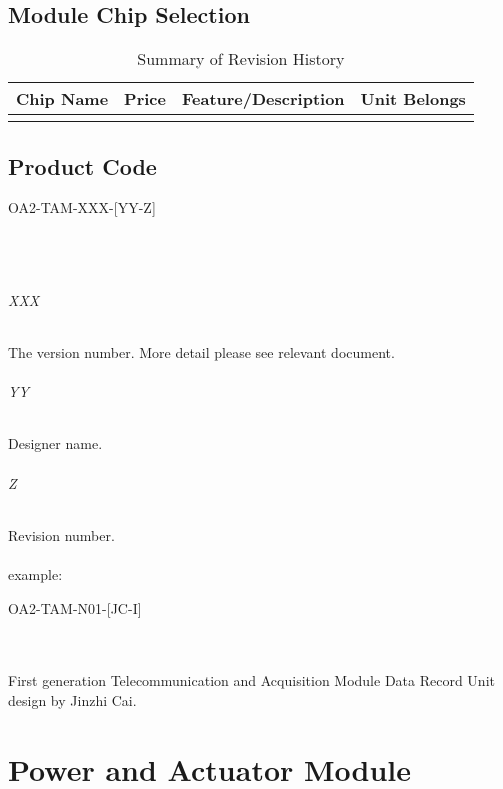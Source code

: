 \documentclass[12pt,article]{memoir}
\begin{document}
\section{Module Chip Selection}
\begin{table}[H]
	\centering
	\begin{tabu}{ c | c | c | c }
		Chip Name & Price & Feature/Description & Unit Belongs\\ \hline
		 & & & \\
	\end{tabu}
	\caption{Summary of Revision History}
	\label{tab:slc}
\end{table}
\section{Product Code}
\begin{LARGE}
OA2-TAM-XXX-[YY-Z]
\end{LARGE}\\\\
\subparagraph{XXX}
The version number. More detail please see relevant document.
\subparagraph{YY}
Designer name.
\subparagraph{Z}
Revision number.\\\\
example: 
\begin{large}
OA2-TAM-N01-[JC-I]
\end{large}\\\\
First generation Telecommunication and Acquisition Module Data Record Unit design by Jinzhi Cai.
\newpage
\chapter{Power and Actuator Module}
\end{document}
